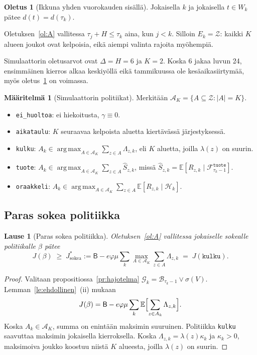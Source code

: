\documentclass[11pt,a4paper]{article}
\theoremstyle{plain}
\newtheorem{lause}{Lause}
\theoremstyle{definition}
\newtheorem{maaritelma}{Määritelmä}
\newtheorem{oletus}{Oletus}
\theoremstyle{remark}
\newcommand{\E}{\mathbb{E}}
\newcommand{\cZ}{\mathcal{Z}}
\newcommand{\cF}{\mathcal{F}}
\newcommand{\cB}{\mathcal{B}}
\newcommand{\cG}{\mathcal{G}}
\newcommand{\cH}{\mathcal{H}}
\newcommand{\cA}{\mathcal{A}}
\newcommand{\1}{\mathbf{1}}
\newcommand{\pol}[1]{\texttt{#1}}
\DeclareMathOperator*{\argmax}{arg\,max}
\begin{document}
\begin{oletus}[Ikkuna yhden vuorokauden sisällä]\label{ol:B}
Jokaisella $k$ ja jokaisella $t \in W_k$ pätee $d(t) = d(\tau_k)$.
\end{oletus}

Oletuksen~\ref{ol:A} vallitessa $\tau_j + H \le \tau_k$ aina, kun $j < k$. Silloin
$E_k = \cZ$: kaikki $K$ alueen joukot ovat kelpoisia, eikä aiempi valinta
rajoita myöhempiä.

Simulaattorin oletusarvot ovat $\Delta = H = 6$ ja $K = 2$. Koska 6 jakaa
luvun 24, ensimmäinen kierros alkaa keskiyöllä eikä tammikuussa ole
kesäaikasiirtymää, myös oletus~\ref{ol:B} on voimassa.

\begin{maaritelma}[Simulaattorin politiikat]\label{maar:koodi}
Merkitään $\cA_K = \{A \subseteq \cZ : |A| = K\}$.
\begin{itemize}
  \item \pol{ei\_huoltoa}: ei hiekoitusta, $\gamma \equiv 0$.
  \item \pol{aikataulu}: $K$ seuraavaa kelpoista aluetta kiertävässä järjestyksessä.
  \item \pol{kulku}: $A_k \in \argmax_{A \in \cA_K} \sum_{z \in A} \Lambda_{z,k}$,
  eli $K$ aluetta, joilla $\lambda(z)$ on suurin.
  \item \pol{tuote}: $A_k \in \argmax_{A \in \cA_K} \sum_{z \in A} \hat S_{z,k}$,
  missä $\hat S_{z,k} = \E[R_{z,k} \mid \cF^{\pol{tuote}}_{\tau_k - 1}]$.
  \item \pol{oraakkeli}: $A_k \in \argmax_{A \in \cA_K} \sum_{z \in A} \E[R_{z,k} \mid \cH_k]$.
\end{itemize}
\end{maaritelma}

\subsection{Paras sokea politiikka}

\begin{lause}[Paras sokea politiikka]\label{la:sokea}
Oletuksen~\ref{ol:A} vallitessa jokaiselle sokealle politiikalle $\beta$ pätee
\[
  J(\beta) \;\ge\; J^\ast_{\mathrm{sokea}} := \mathsf{B} - e\varphi\mu \sum_{k} \max_{A \in \cA_K} \sum_{z \in A} \Lambda_{z,k}
  \;=\; J(\pol{kulku}).
\]
\end{lause}

\begin{proof}
Valitaan propositiossa~\ref{pr:hajotelma} $\cG_k = \cB_{\tau_k - 1} \vee \sigma(V)$.
Lemman~\ref{le:ehdollinen}~(ii) mukaan
\[
  J(\beta) = \mathsf{B} - e\varphi\mu \sum_k \E\Bigl[\sum_{z \in A_k} \Lambda_{z,k}\Bigr].
\]
Koska $A_k \in \cA_K$, summa on enintään maksimin suuruinen. Politiikka
\pol{kulku} saavuttaa maksimin jokaisella kierroksella. Koska
$\Lambda_{z,k} = \lambda(z)\kappa_k$ ja $\kappa_k > 0$, maksimoiva joukko
koostuu niistä $K$ alueesta, joilla $\lambda(z)$ on suurin.
\end{proof}
\end{document}
